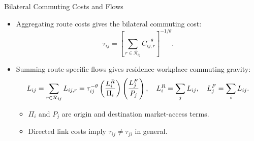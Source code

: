 \documentclass[11pt,aspectratio=169]{beamer}
\newcommand{\R}{\mathcal{R}}
\begin{document}
\begin{frame}[label=bilateral]{Bilateral Commuting Costs and Flows}
\begin{itemize}\small
  \item Aggregating route costs gives the bilateral commuting cost:
  \vspace{-0.5em}\begin{equation}\label{eq:bilateral}
    \tau_{ij} = \left[\sum_{r\in\R_{ij}} C_{ij,r}^{-\theta}\right]^{-1/\theta}.
  \end{equation}
  \vspace{-0.5em}
  \item Summing route-specific flows gives residence-workplace commuting gravity:
  \vspace{-0.35em}\begin{equation}\label{eq:gravity}
    L_{ij}=\sum_{r\in\R_{ij}}L_{ij,r}
    =\tau_{ij}^{-\theta}\left(\frac{L_i^R}{\Pi_i}\right)\left(\frac{L_j^F}{P_j}\right),
    \quad L_i^R=\sum_jL_{ij},\quad L_j^F=\sum_iL_{ij}.
  \vspace{-0.8em}\end{equation}
  \begin{itemize}\footnotesize
    \item $\Pi_i$ and $P_j$ are origin and destination market-access terms.
    \item Directed link costs imply $\tau_{ij}\neq\tau_{ji}$ in general.
  \end{itemize}
\end{itemize}
\end{frame}
\end{document}
